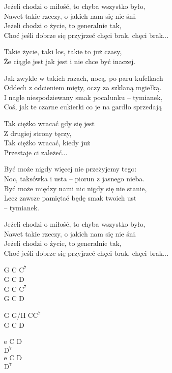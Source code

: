 \begin{text}
Jeżeli chodzi o miłość, to chyba wszystko było,\\
Nawet takie rzeczy, o jakich nam się nie śni.\\
Jeżeli chodzi o życie, to generalnie tak,\\
Choć jeśli dobrze się przyjrzeć chęci brak, chęci brak...

\vin Takie życie, taki los, takie to już czasy,\\
\vin Że ciągle jest jak jest i nie chce być inaczej.

Jak zwykle w takich razach, nocą, po paru kufelkach\\
Oddech z odcieniem mięty, oczy za szklaną mgiełką.\\
I nagle niespodziewany smak pocałunku – tymianek,\\
Coś, jak te czarne cukierki co je na gardło sprzedają

\vin Tak ciężko wracać gdy się jest\\
\vin Z drugiej strony tęczy,\\
\vin Tak ciężko wracać, kiedy już\\
\vin Przestaje ci zależeć...

Być może nigdy więcej nie przeżyjemy tego:\\
Noc, taksówka i usta – piorun z jasnego nieba.\\
Być może między nami nic nigdy się nie stanie,\\
Lecz zawsze pamiętać będę smak twoich ust\\
\vin\vin\vin\vin\vin\vin – tymianek.

Jeżeli chodzi o miłość, to chyba wszystko było,\\
Nawet takie rzeczy, o jakich nam się nie śni.\\
Jeżeli chodzi o życie, to generalnie tak,\\
Choć jeśli dobrze się przyjrzeć chęci brak, chęci brak...
\end{text}
\begin{chord}
    G C $\mathrm{C^7}$\\
    G C D\\
    G C $\mathrm{C^7}$\\
    G C D

    G G/H C$\mathrm{C^7}$\\
    G C D

    \hfill\break
    \hfill\break
    \hfill\break
    \hfill\break
    \hfill\break
    e C D\\
    $\mathrm{D^7}$\\
    e C D\\
    $\mathrm{D^7}$
\end{chord}
